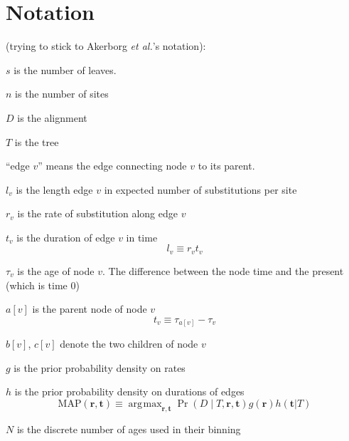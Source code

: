 \documentclass{llncs}
\newcommand{\etal}[0]{{\em et al.}\xspace}
\newcommand{\numLeaves}[0]{\ensuremath{s}\xspace}
\newcommand{\numSites}[0]{\ensuremath{n}\xspace}
\newcommand{\dataMatrix}[0]{\ensuremath{D}\xspace}
\newcommand{\tree}[0]{\ensuremath{T}\xspace}
\newcommand{\edgeLen}[1]{\ensuremath{l_{#1}}\xspace}
\newcommand{\rate}[1]{\ensuremath{r_{#1}}\xspace}
\newcommand{\ratevec}[0]{\ensuremath{\mathbf{r}}\xspace}
\newcommand{\timevec}[0]{\ensuremath{\mathbf{t}}\xspace}
\newcommand{\duration}[1]{\ensuremath{t_{#1}}\xspace}
\newcommand{\age}[1]{\ensuremath{\tau_{#1}}\xspace}
\newcommand{\parent}[1]{\ensuremath{a[{#1}]}\xspace}
\newcommand{\firstChild}[1]{\ensuremath{b[{#1}]}\xspace}
\newcommand{\secondChild}[1]{\ensuremath{c[{#1}]}\xspace}
\newcommand{\ratePriorDensity}[0]{\ensuremath{g}\xspace}
\newcommand{\timePriorDensity}[0]{\ensuremath{h}\xspace}
\newcommand{\numAges}[0]{\ensuremath{N}\xspace}
\DeclareMathOperator*{\argmax}{\arg\!\max}
\begin{document}
\section{Notation}
(trying to stick to Akerborg \etal's notation):
\begin{compactitem}
    \item[\numLeaves] is the number of leaves.
    \item[\numSites] is the number of sites
    \item[\dataMatrix] is the alignment
    \item[\tree] is the tree
    \item[``edge $v$''] means the edge connecting node $v$ to its parent.
    \item[\edgeLen{v}] is the length edge $v$ in expected number of substitutions per site
    \item[\rate{v}] is the rate of substitution along edge $v$
    \item[\duration{v}] is the duration of edge $v$ in time
\begin{equation}
    \edgeLen{v} \equiv \rate{v}\duration{v}
\end{equation}
    \item[\age{v}] is the age of node $v$. The difference between the node time and the present (which is time 0)
    \item[\parent{v}] is the parent node of node $v$
\begin{equation}
    \duration{v} \equiv \age{\parent{v}} - \age{v}
\end{equation}
    \item[\firstChild{v}, \secondChild{v}] denote the two children of node $v$
    \item[\ratePriorDensity] is the prior probability density on rates
    \item[\timePriorDensity] is the prior probability density on durations of edges
\begin{equation}
    \mbox{MAP}(\ratevec, \timevec)  \equiv \argmax_{\ratevec, \timevec} \Pr\left(\dataMatrix \mid \tree, \ratevec, \timevec\right) \ratePriorDensity(\ratevec) \timePriorDensity(\timevec | T)
\end{equation}
    \item[\numAges] is the discrete number of ages used in their binning
\end{compactitem}
\end{document}
